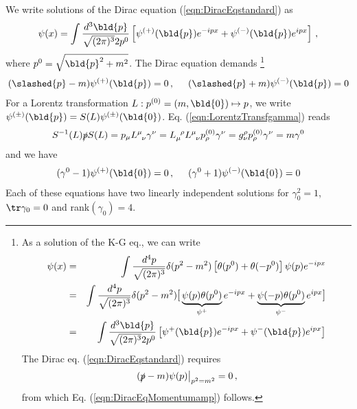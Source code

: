 We write solutions of the Dirac equation (\ref{eqn:DiracEqstandard}) as
\begin{eqnarray}
\psi(x) = \int \frac{d^3 \bld{p}}{\sqrt{(2\pi)^3} 2 p^0}
 \left[
\psi^{(+)}(\bld{p}) e^{-ipx} + \psi^{(-)}(\bld{p}) e^{ipx}
\right]\,,
\end{eqnarray}
where $p^0 = \sqrt{\bld{p}^2 + m^2}$.
The Dirac equation demands
\footnote{%
As  a solution of the K-G eq., we can write
\begin{eqnarray*}
\psi(x) &=& \int \frac{d^4 p}{\sqrt{(2\pi)^3}}
\delta(p^2 - m^2) 
 \left[
 \theta(p^0) +  \theta(-p^0) \right]
 \psi(p) e^{-ipx}
\\
&=&
\int \frac{d^4 p}{\sqrt{(2\pi)^3}}
\delta(p^2 - m^2)  
{\large \mbox{[}}
\underbrace{\psi(p)\theta(p^0)}_{\psi^{+}}  e^{-ipx} + 
\underbrace{\psi(-p)\theta(p^0)}_{\psi^{-}}  e^{ipx}
{\large \mbox{]}}
\\
&=&
\int \frac{d^3 \bld{p}}{\sqrt{(2\pi)^3}2p^0}
\left[
\psi^{+}(\bld{p})  e^{-ipx} + \psi^{-}(\bld{p})  e^{ipx}
\right]
\end{eqnarray*}
The Dirac eq. (\ref{eqn:DiracEqstandard}) requires
\begin{eqnarray*}
\left. (\slashed{p} - m) \psi(p) \right|_{p^2 = m^2} = 0\,,
\end{eqnarray*}
from which Eq. (\ref{eqn:DiracEqMomentumamp}) follows.
}%
\begin{eqnarray}
(\slashed{p} - m) \psi^{(+)}(\bld{p}) = 0\,,
\hspace{5mm}
(\slashed{p} + m) \psi^{(-)}(\bld{p}) = 0
\label{eqn:DiracEqMomentumamp}
\end{eqnarray}
For a Lorentz transformation $L: p^{(0)} = (m, \bld{0}) \mapsto p$, we write
$\psi^{(\pm)}(\bld{p}) = S(L) \psi^{(\pm)}(\bld{0})$.
Eq. (\ref{eqn:LorentzTransfgamma}) reads
\begin{eqnarray*}
S^{-1}(L) \slashed{p} S(L)
=
p_\mu L^\mu_{\;\;\nu} \gamma^\nu
=
L_\mu^{\;\;\rho} L^\mu_{\;\;\nu} p^{(0)}_\rho \gamma^\nu
=
g^\rho_\nu p^{(0)}_\rho \gamma^\nu
=
m \gamma^0
\end{eqnarray*}
and we have
\begin{eqnarray*}
(\gamma^0 - 1) \psi^{(+)}(\bld{0}) = 0\,,
\hspace{5mm}
(\gamma^0 + 1) \psi^{(-)}(\bld{0}) = 0
\end{eqnarray*}
\bigskip
Each of these equations have two linearly independent solutions
for $\gamma_0^2 =1$, $\tr \gamma_0 = 0$ and rank$(\gamma_0) = 4$.
